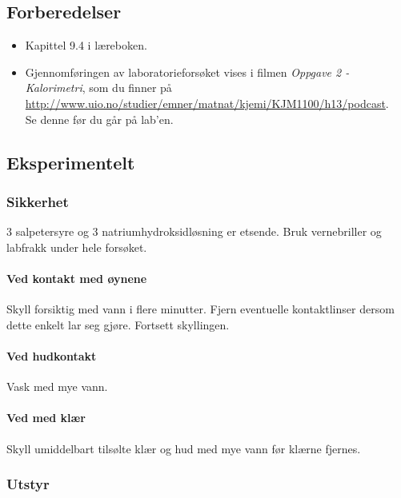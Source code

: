 		\subsection{Forberedelser}
	\begin{itemize}
		\item Kapittel 9.4 i læreboken.
		\item Gjennomføringen av laboratorieforsøket vises i filmen \emph{Oppgave 2 - Kalorimetri}, som du finner på \\ \url{http://www.uio.no/studier/emner/matnat/kjemi/KJM1100/h13/podcast}. \\
		Se denne før du går på lab'en.
	\end{itemize}
	
	\subsection{Eksperimentelt}
	
	\subsubsection{Sikkerhet}
	\SI{3}{\molar} salpetersyre og \SI{3}{\molar} natriumhydroksidløsning er etsende.
	Bruk vernebriller og labfrakk under hele forsøket.
	
	\paragraph{Ved kontakt med øynene}
	Skyll forsiktig med vann i flere minutter.
	Fjern eventuelle kontaktlinser dersom dette enkelt lar seg gjøre.
	Fortsett skyllingen.
	
	\paragraph{Ved hudkontakt}
	Vask med mye vann.
	
	\paragraph{Ved med klær}
	Skyll umiddelbart tilsølte klær og hud med mye vann før klærne fjernes.
	
	\subsubsection{Utstyr}
	
